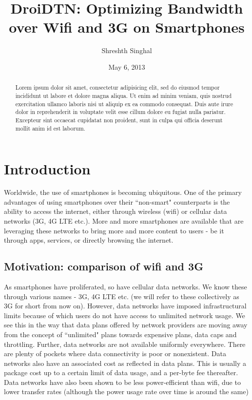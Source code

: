 \documentclass[12pt, fleqn]{article}
\title{DroiDTN: Optimizing Bandwidth over Wifi and 3G on Smartphones}
\author{Shreshth Singhal}
\date{May 6, 2013}
\begin{document}
\maketitle

\begin{abstract}
  Lorem ipsum dolor sit amet, consectetur adipisicing elit, sed do eiusmod 
  tempor incididunt ut labore et dolore magna aliqua. Ut enim ad minim veniam, 
quis nostrud exercitation ullamco laboris nisi ut aliquip ex ea commodo consequat. 
Duis aute irure dolor in reprehenderit in voluptate velit esse cillum dolore eu fugiat 
nulla pariatur. Excepteur sint occaecat cupidatat non proident, sunt in culpa qui officia 
deserunt mollit anim id est laborum.
\end{abstract}


\section{Introduction}

Worldwide, the use of smartphones is becoming ubiquitous. One of the primary 
advantages of using smartphones over their ``non-smart" counterparts 
is the ability to access the internet, either through wireless (wifi) or 
cellular data networks (3G, 4G LTE etc.). More and more smartphones are available that are leveraging 
these networks to bring more and more content to users - be it through apps, 
services, or directly browsing the internet.


\subsection{Motivation: comparison of wifi and 3G}

As smartphones have proliferated,  so have cellular data networks. We know these through 
various names - 3G, 4G LTE etc. (we will refer to these collectively as 3G for short from now on).
 However, data networks have imposed infrastructural limits because of 
which users do not have access to unlimited network usage. We see this in the 
way that data plans offered by network providers are moving away from the 
concept of ``unlimited" plans towards expensive plans, data caps and throttling.\cite{att-data-plans}\cite{verizon-data-plans}
Further, data networks are not available 
uniformly everywhere. There are plenty of pockets where data connectivity is 
poor or nonexistent.\cite{att-coverage}\cite{verizon-coverage} Data networks also have an associated cost as reflected in 
data plans. This is usually a package cost up to a certain limit of data usage, 
and a per-byte fee thereafter. Data networks have also been shown to be less 
power-efficient than wifi, due to lower transfer rates (although the power usage
rate over time is around the same)\cite[p. 8]{lee-2012}
\end{document}
